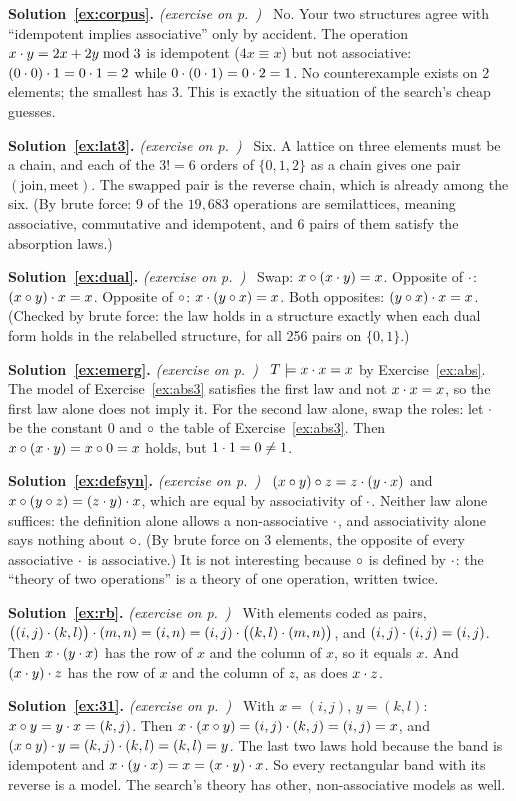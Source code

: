 \documentclass[11pt,a4paper]{article}
\newcommand{\solution}[1]{\par\medskip\noindent\textbf{Solution~\ref{ex:#1}.}\label{sol:#1}
  \textit{(exercise on p.~\pageref{ex:#1})}\ }
\begin{document}
\solution{corpus}
No. Your two structures agree with ``idempotent implies associative'' only by accident. The operation
$x\cdot y=2x+2y\bmod 3$ is idempotent ($4x\equiv x$) but not associative: $(0\cdot0)\cdot1=0\cdot1=2$ while
$0\cdot(0\cdot1)=0\cdot2=1$. No counterexample exists on 2 elements; the smallest has 3. This is exactly the situation
of the search's cheap guesses.

\solution{lat3}
Six. A lattice on three elements must be a chain, and each of the $3!=6$ orders of $\{0,1,2\}$ as a chain gives
one pair $(\text{join},\text{meet})$. The swapped pair is the reverse chain, which is already among the six. (By
brute force: 9 of the $19{,}683$ operations are semilattices, meaning associative, commutative and idempotent, and 6
pairs of them satisfy the absorption laws.)

\solution{dual}
Swap: $x\circ(x\cdot y)=x$. Opposite of $\cdot$: $(x\circ y)\cdot x=x$. Opposite of $\circ$: $x\cdot(y\circ x)=x$. Both
opposites: $(y\circ x)\cdot x=x$. (Checked by brute force: the law holds in a structure exactly when each dual form
holds in the relabelled structure, for all 256 pairs on $\{0,1\}$.)

\solution{emerg}
$T\models x\cdot x=x$ by Exercise~\ref{ex:abs}. The model of Exercise~\ref{ex:abs3} satisfies the first law and not
$x\cdot x=x$, so the first law alone does not imply it. For the second law alone, swap the roles: let $\cdot$ be the
constant $0$ and $\circ$ the table of Exercise~\ref{ex:abs3}. Then $x\circ(x\cdot y)=x\circ 0=x$ holds, but
$1\cdot1=0\neq1$.

\solution{defsyn}
$(x\circ y)\circ z=z\cdot(y\cdot x)$ and $x\circ(y\circ z)=(z\cdot y)\cdot x$, which are equal by associativity of $\cdot$. Neither law
alone suffices: the definition alone allows a non-associative $\cdot$, and associativity alone says nothing about
$\circ$. (By brute force on 3 elements, the opposite of every associative $\cdot$ is associative.) It is not interesting
because $\circ$ is defined by $\cdot$: the ``theory of two operations'' is a theory of one operation, written twice.

\solution{rb}
With elements coded as pairs, $\bigl((i,j)\cdot(k,l)\bigr)\cdot(m,n)=(i,n)=(i,j)\cdot\bigl((k,l)\cdot(m,n)\bigr)$, and
$(i,j)\cdot(i,j)=(i,j)$. Then $x\cdot(y\cdot x)$ has the row of $x$ and the column of $x$, so it equals $x$. And
$(x\cdot y)\cdot z$ has the row of $x$ and the column of $z$, as does $x\cdot z$.

\solution{31}
With $x=(i,j)$, $y=(k,l)$: $x\circ y=y\cdot x=(k,j)$. Then $x\cdot(x\circ y)=(i,j)\cdot(k,j)=(i,j)=x$, and
$(x\circ y)\cdot y=(k,j)\cdot(k,l)=(k,l)=y$. The last two laws hold because the band is idempotent and
$x\cdot(y\cdot x)=x=(x\cdot y)\cdot x$. So every rectangular band with its reverse is a model. The search's theory has other,
non-associative models as well.
\end{document}
